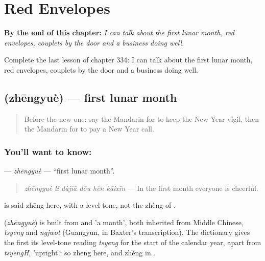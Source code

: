 
\chapter{Red Envelopes}
\label{ch:zh-red-envelopes}

\begin{chapteropening}
\textbf{By the end of this chapter:} \emph{I can talk about the first lunar month, red envelopes, couplets by the door and a business doing well.}

Complete the last lesson of chapter 334: I can talk about the first lunar month, red envelopes, couplets by the door and a business doing well.
\end{chapteropening}

\section[\texorpdfstring{\zh{正月} (zhēngyuè)}{正月 (zhēngyuè)}]{ (zhēngyuè) — first lunar month}

\label{lesson:ZH-C334-zhengyue}



\begin{quote}
Before the new one: say the Mandarin for to keep the New Year vigil, then the Mandarin for to pay a New Year call.
\end{quote}

\subsection*{You'll want to know: }
\textbf{} — \emph{zhēngyuè} — \textquotedblleft{}first lunar month\textquotedblright{}.

\begin{quote}
\textbf{} \emph{zhēngyuè lǐ dàjiā dōu hěn kāixīn} — In the first month everyone is cheerful.
\end{quote}

 is said zhēng here, with a level tone, not the zhèng of .

\begin{cousinweb}
\textbf{} (\emph{zhēngyuè}) is built from  and  'a month', both inherited from Middle Chinese, \emph{tsyeng} and \emph{ngjwot} (Guangyun, in Baxter's transcription). The dictionary gives the first its level-tone reading \emph{tsyeng} for the start of the calendar year, apart from \emph{tsyengH}, 'upright': so zhēng here, and zhèng in .
\end{cousinweb}

